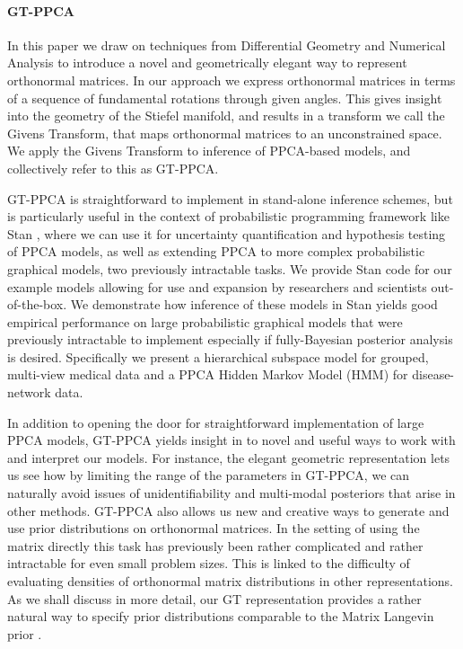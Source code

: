 \documentclass{article}
\begin{document}
\paragraph{GT-PPCA}  In this paper we draw on techniques from Differential Geometry and Numerical Analysis to introduce a novel and geometrically elegant way to represent orthonormal matrices.  In our approach we express orthonormal matrices in terms of a sequence of fundamental rotations through given angles. This gives insight into the geometry of the Stiefel manifold, and results in a transform we call the Givens Transform, that maps orthonormal matrices to an unconstrained space. We apply the Givens Transform to inference of PPCA-based models, and collectively refer to this as GT-PPCA.

GT-PPCA is straightforward to implement in stand-alone inference schemes, but is particularly useful in the context of probabilistic programming framework like Stan \citep{carpenter2016stan}, where we can use it for uncertainty quantification and hypothesis testing of PPCA models, as well as extending PPCA to more complex probabilistic graphical models, two previously intractable tasks. We provide Stan code for our example models allowing for use and expansion by researchers and scientists out-of-the-box. We demonstrate how inference of these models in Stan yields good empirical performance on large probabilistic graphical models that were previously intractable to implement especially if fully-Bayesian posterior analysis is desired. Specifically we present a hierarchical subspace model for grouped, multi-view medical data and a PPCA Hidden Markov Model (HMM) for disease-network data.

In addition to opening the door for straightforward implementation of large PPCA models, GT-PPCA yields insight in to novel and useful ways to work with and interpret our models.  For instance, the elegant geometric representation lets us see how by limiting the range of the parameters in GT-PPCA, we can naturally avoid issues of unidentifiability and multi-modal posteriors that arise in other methods.  GT-PPCA also allows us new and creative ways to generate and use prior distributions on orthonormal matrices.  In the setting of using the matrix directly this task has previously been rather complicated and rather intractable for even small problem sizes.  This is linked to the difficulty of evaluating densities of orthonormal matrix distributions in other representations.  As we shall discuss in more detail, our GT representation provides a rather natural way to specify prior distributions comparable to the Matrix Langevin prior \citep{muirhead2009aspects}.
\end{document}
